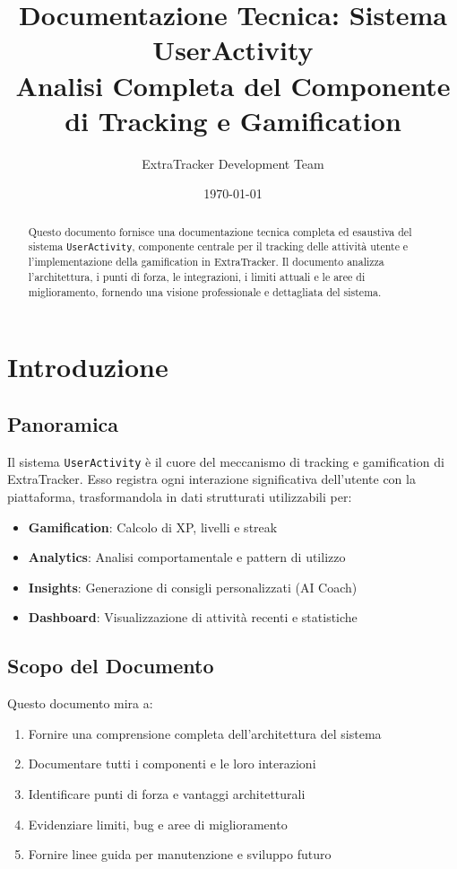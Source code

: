 \documentclass[11pt,a4paper]{article}
\title{
    \textbf{Documentazione Tecnica: Sistema UserActivity} \\
    \large{Analisi Completa del Componente di Tracking e Gamification}
}
\author{ExtraTracker Development Team}
\date{\today}
\begin{document}
\maketitle

\begin{abstract}
Questo documento fornisce una documentazione tecnica completa ed esaustiva del sistema \texttt{UserActivity}, componente centrale per il tracking delle attività utente e l'implementazione della gamification in ExtraTracker. Il documento analizza l'architettura, i punti di forza, le integrazioni, i limiti attuali e le aree di miglioramento, fornendo una visione professionale e dettagliata del sistema.
\end{abstract}

\tableofcontents
\newpage

\section{Introduzione}

\subsection{Panoramica}

Il sistema \texttt{UserActivity} è il cuore del meccanismo di tracking e gamification di ExtraTracker. Esso registra ogni interazione significativa dell'utente con la piattaforma, trasformandola in dati strutturati utilizzabili per:

\begin{itemize}
    \item \textbf{Gamification}: Calcolo di XP, livelli e streak
    \item \textbf{Analytics}: Analisi comportamentale e pattern di utilizzo
    \item \textbf{Insights}: Generazione di consigli personalizzati (AI Coach)
    \item \textbf{Dashboard}: Visualizzazione di attività recenti e statistiche
\end{itemize}

\subsection{Scopo del Documento}

Questo documento mira a:

\begin{enumerate}
    \item Fornire una comprensione completa dell'architettura del sistema
    \item Documentare tutti i componenti e le loro interazioni
    \item Identificare punti di forza e vantaggi architetturali
    \item Evidenziare limiti, bug e aree di miglioramento
    \item Fornire linee guida per manutenzione e sviluppo futuro
\end{enumerate}
\end{document}
